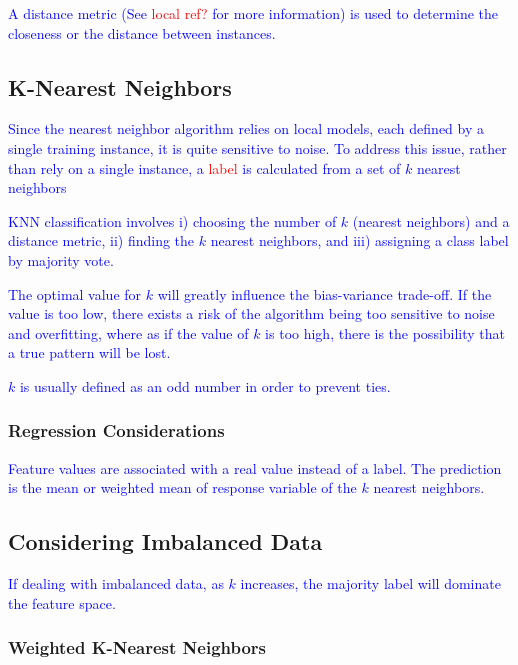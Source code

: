 \textcolor{blue}{A distance metric (See \textcolor{red}{local ref?} for more information) is used to determine the closeness or the distance between instances.}

\subsection{K-Nearest Neighbors}

\textcolor{blue}{Since the nearest neighbor algorithm relies on local models, each defined by a single training instance, it is quite sensitive to noise. To address this issue, rather than rely on a single instance, a \textcolor{red}{label} is calculated from a set of $k$ nearest neighbors}

\textcolor{blue}{KNN classification involves i) choosing the number of $k$ (nearest neighbors) and a distance metric, ii) finding the $k$ nearest neighbors, and iii) assigning a class label by majority vote.}

\textcolor{blue}{The optimal value for $k$ will greatly influence the bias-variance trade-off. If the value is too low, there exists a risk of the algorithm being too sensitive to noise and overfitting, where as if the value of $k$ is too high, there is the possibility that a true pattern will be lost.}

\textcolor{blue}{$k$ is usually defined as an odd number in order to prevent ties.}

\subsubsection{Regression Considerations}

\textcolor{blue}{Feature values are associated with a real value instead of a label. The prediction is the mean or weighted mean of response variable of the $k$ nearest neighbors.}

\subsection{Considering Imbalanced Data}

\textcolor{blue}{If dealing with imbalanced data, as $k$ increases, the majority label will dominate the feature space.}

\subsubsection{Weighted K-Nearest Neighbors}


